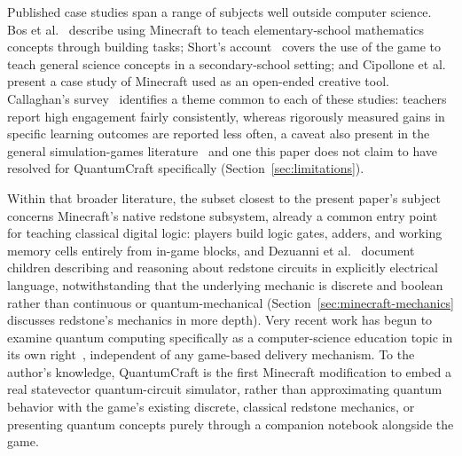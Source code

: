Published case studies span a range of subjects well outside computer science. Bos et
al.~\cite{bos2014mathematics} describe using Minecraft to teach elementary-school mathematics
concepts through building tasks; Short's account~\cite{short2012teaching} covers the use of
the game to teach general science concepts in a secondary-school setting; and Cipollone et
al.~\cite{cipollone2014creative} present a case study of Minecraft used as an open-ended
creative tool. Callaghan's survey~\cite{callaghan2016investigating} identifies a theme common
to each of these studies: teachers report high engagement fairly consistently, whereas
rigorously measured gains in specific learning outcomes are reported less often, a caveat
also present in the general simulation-games literature~\cite{sitzmann2011meta} and one this
paper does not claim to have resolved for QuantumCraft specifically
(Section~\ref{sec:limitations}).

Within that broader literature, the subset closest to the present paper's subject concerns
Minecraft's native redstone subsystem, already a common entry point for teaching classical
digital logic: players build logic gates, adders, and working memory cells entirely from
in-game blocks, and Dezuanni et al.~\cite{dezuanni2015redstone} document children describing
and reasoning about redstone circuits in explicitly electrical language, notwithstanding that
the underlying mechanic is discrete and boolean rather than continuous or quantum-mechanical
(Section~\ref{sec:minecraft-mechanics} discusses redstone's mechanics in more depth). Very
recent work has begun to examine quantum computing specifically as a computer-science
education topic in its own right~\cite{seegerer2021quantum}, independent of any game-based
delivery mechanism. To the author's knowledge, QuantumCraft is the first Minecraft
modification to embed a real statevector quantum-circuit simulator, rather than approximating
quantum behavior with the game's existing discrete, classical redstone mechanics, or
presenting quantum concepts purely through a companion notebook alongside the game.
